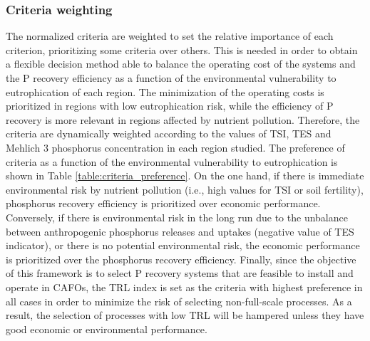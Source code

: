 \documentclass[authoryear]{elsarticle}
\begin{document}
\subsubsection{Criteria weighting}
The normalized criteria are weighted to set the relative importance of each criterion, prioritizing some criteria over others. This is needed in order to 
obtain a flexible decision method able to balance the operating cost of the systems and the P recovery efficiency as a function of the environmental vulnerability to eutrophication of each region. The minimization of the operating costs is prioritized in regions with low eutrophication risk, while the efficiency of P recovery is more relevant in regions affected by nutrient pollution. Therefore, 
the criteria are dynamically weighted according to the values of TSI, TES and Mehlich 3 phosphorus concentration in each region studied. The preference of criteria as a function of the environmental vulnerability to eutrophication is shown in Table \ref{table:criteria_preference}.
%
%
On the one hand, if there is immediate environmental risk by nutrient pollution (i.e., high values for TSI or soil fertility),
phosphorus recovery efficiency is prioritized over economic performance. Conversely, if there is environmental risk in the long run due to the unbalance between anthropogenic phosphorus releases and uptakes (negative value of TES indicator), or there is no potential environmental risk, the economic performance 
is prioritized over the
phosphorus recovery efficiency. 
Finally, since the objective of this framework is to select P recovery systems that are feasible to install and operate in CAFOs, the TRL index is set as the criteria with highest preference in all cases in order to minimize the risk of selecting non-full-scale processes. As a result, the selection of processes with low TRL will be hampered unless they have good economic or environmental performance.
\end{document}
